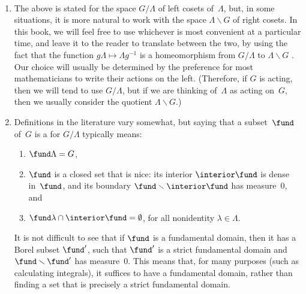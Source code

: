 \begin{rem} \ 
\noprelistbreak
\begin{enumerate}
\item The above  is stated for the space $G/\Lambda$ of left cosets of~$\Lambda$, but, in some situations, it is more natural to work with the space $\Lambda \backslash G$ of right cosets. In this book, we will feel free to use whichever is most convenient at a particular time, and leave it to the reader to translate between the two, by using the fact that the function $g \Lambda \mapsto \Lambda g^{-1}$ is a homeomorphism from $G/\Lambda$ to $\Lambda \backslash G$ . Our choice will usually be determined by the preference for most mathematicians to write their actions on the left. (Therefore, if $G$ is acting, then we will tend to use $G/\Lambda$, but if we are thinking of~$\Lambda$ as acting on~$G$, then we usually consider the quotient $\Lambda \backslash G$.)

\item Definitions in the literature vary somewhat, but saying that a subset~$\fund$ of~$G$ is a  for $G/\Lambda$ typically means:
	\begin{enumerate}
	\item $\fund \Lambda = G$,
	\item $\fund$ is a closed set that is nice: its interior $\interior\fund$ is dense in~$\fund$, and its boundary $\fund \smallsetminus \interior\fund$ has measure~$0$,
	and
	\item $\fund \lambda \cap \interior\fund = \emptyset$, for all nonidentity $\lambda \in \Lambda$.
	\end{enumerate}
It is not difficult to see that if $\fund$ is a fundamental domain, then it has a Borel subset $\fund'$, such that $\fund'$ is a strict fundamental domain and $\fund \smallsetminus \fund'$ has measure~$0$. This means that, for many purposes (such as calculating integrals), it suffices to have a fundamental domain, rather than finding a set that is precisely a strict fundamental domain.
\end{enumerate}
\end{rem}

